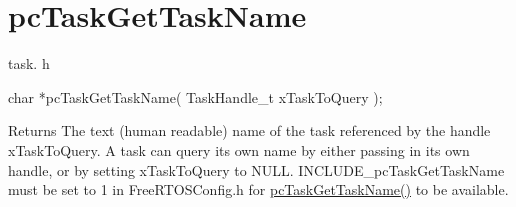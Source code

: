 \hypertarget{group__pc_task_get_task_name}{}\section{pc\+Task\+Get\+Task\+Name}
\label{group__pc_task_get_task_name}
task. h 
\begin{DoxyPre}char *pcTaskGetTaskName( TaskHandle\_t xTaskToQuery );\end{DoxyPre}


\begin{DoxyReturn}{Returns}
The text (human readable) name of the task referenced by the handle x\+Task\+To\+Query. A task can query its own name by either passing in its own handle, or by setting x\+Task\+To\+Query to N\+U\+LL. I\+N\+C\+L\+U\+D\+E\+\_\+pc\+Task\+Get\+Task\+Name must be set to 1 in Free\+R\+T\+O\+S\+Config.\+h for \hyperlink{task_8h_a4344bd56963429dfa26b0af913349e84}{pc\+Task\+Get\+Task\+Name()} to be available. 
\end{DoxyReturn}
